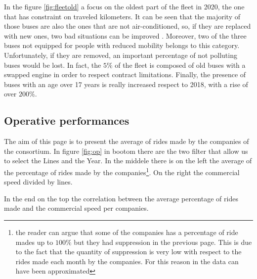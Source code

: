 \newpage
\begin{landscape}
\thispagestyle{empty}

\end{landscape}
\newpage

In the figure \ref{fig:fleetold}  a focus on the oldest part of the fleet in 2020, the one that has constraint on traveled kilometers. 
It can be seen that the majority of those buses are also the ones that are not air-conditioned, so, if they are replaced with new ones, two bad situations can be improved . Moreover, two of the three buses not equipped for people with reduced mobility belongs to this category. Unfortunately, if they are removed, an important percentage of not polluting buses would be lost. In fact, the $5\%$ of the fleet is composed of old buses with a swapped engine in order to respect contract limitations. Finally, the presence of buses with an age over 17 years is really increased respect to 2018, with a rise of over $200\%$.

\newpage
\begin{landscape}
\thispagestyle{empty}

\end{landscape}
\newpage

\subsection{Operative performances}
The aim of this page is to present the average of rides made by the companies of the consortium. 
In figure \ref{fig:op} in bootom there are the two filter that allow us to select the Lines and the Year.
In the middele there is on the left the average of the percentage of rides made by the companies\footnote{the reader can argue that some of the companies has a percentage of ride mades up to $100\%$ but they had suppression in the previous page. This is due to the fact that the quantity of suppression is very low with respect to the rides made each month by the companies. For this reason in the data can have been approximated}. On the right the commercial speed divided by lines.

In the end on the top the correlation between the average percentage of rides made and the commercial speed per companies.

